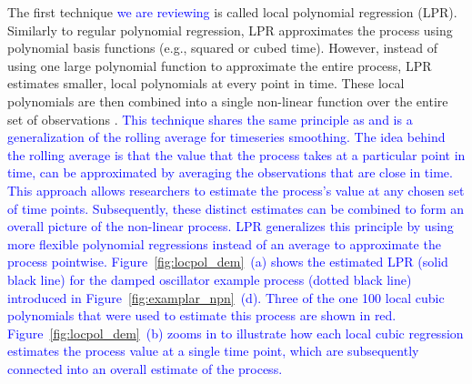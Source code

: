 \documentclass[man, floatsintext]{apa7}
\begin{document}
The first technique \textcolor{blue}{we are reviewing} is called local
polynomial regression (LPR). Similarly to regular polynomial regression, LPR
approximates the process using polynomial basis functions (e.g., squared or
cubed time). However, instead of using one large polynomial function to
approximate the entire process, LPR estimates smaller, local polynomials at
every point in time. These local polynomials are then combined into a single
non-linear function over the entire set of observations
\parencite{fan_adaptive_1995, ruppert_multivariate_1994, fan_local_2018}.
\textcolor{blue}{This technique shares the same principle as and is a
  generalization of the rolling average for timeseries smoothing.
  The idea behind the rolling average is that the value that the process
  takes at a particular point in time, can be approximated by averaging
  the observations that are close in time. This approach allows researchers to
  estimate
  the process's value at any chosen set of time points. Subsequently, these
  distinct
  estimates
  can be combined to form an overall picture of the non-linear
  process.
  LPR generalizes this principle by using more
  flexible polynomial regressions instead of an average to approximate the
  process pointwise.
  Figure~\ref{fig:locpol_dem}~(a) shows the estimated LPR (solid black line)
  for the damped oscillator example process (dotted black line) introduced in
  Figure~\ref{fig:examplar_npn}~(d). Three of the one 100 local cubic
  polynomials that were used to estimate this process are shown in red.
  Figure~\ref{fig:locpol_dem}~(b) zooms in to
  illustrate how each local cubic regression estimates the process value at a
  single time point, which are subsequently connected into an overall estimate
  of the process.}

\begin{sidewaysfigure*}[htbp]
  \caption{Demonstration of a local polynomial regression}
  \label{fig:locpol_dem}
\end{sidewaysfigure*}
\end{document}
